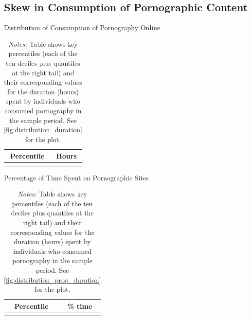 \documentclass[12pt, letterpaper]{article}
\begin{document}
\subsection{Skew in Consumption of Pornographic Content}

\begin{table}[ht] \centering \small \setlength\tabcolsep{10 pt}
	\caption{Distribution of Consumption of Pornography Online}
	\label{tab:distribution_duration}
	\begin{adjustbox}{max width=\textwidth}
		\begin{tabular}{cr}
			\toprule
			\multicolumn{1}{c}{\textbf{Percentile}}&\multicolumn{1}{c}{\textbf{Hours}}\\
			\midrule
			\\
			\bottomrule
		\end{tabular}
	\end{adjustbox}
	\caption*{\footnotesize \emph{Notes:} 
		Table shows key percentiles (each of the ten deciles plus quantiles at the right tail) and their corresponding values for the duration (hours) spent by individuals who consumed pornography in the sample period. 
		See \cref{fig:distribution_duration} for the plot.
	}
\end{table}

\begin{table}[ht] \centering \small \setlength\tabcolsep{10 pt}
	\caption{Percentage of Time Spent on Pornographic Sites}
	\label{tab:distribution_prop_duration}
	\begin{adjustbox}{max width=\textwidth}
		\begin{tabular}{cr}
			\toprule
			\multicolumn{1}{c}{\textbf{Percentile}}&\multicolumn{1}{c}{\textbf{\% time}}\\
			\midrule
			\\
			\bottomrule
		\end{tabular}
	\end{adjustbox}
	\caption*{\footnotesize \emph{Notes:} 
		Table shows key percentiles (each of the ten deciles plus quantiles at the right tail) and their corresponding values for the duration (hours) spent by individuals who consumed pornography in the sample period. 
		See \cref{fig:distribution_prop_duration} for the plot.
	}
\end{table}
\end{document}
